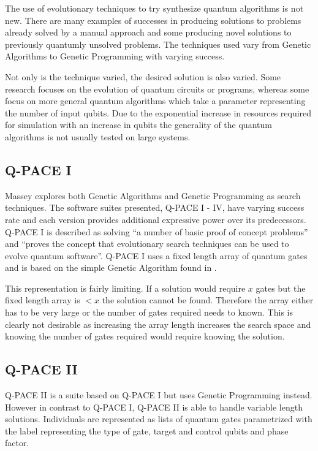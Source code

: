 The use of evolutionary techniques to try synthesize quantum algorithms is not new.
There are many examples of successes in producing solutions to problems already solved by a manual approach and some producing novel solutions to previously quantumly unsolved problems.
The techniques used vary from Genetic Algorithms to Genetic Programming with varying success.

Not only is the technique varied, the desired solution is also varied.
Some research focuses on the evolution of quantum circuits or programs, whereas some focus on more general quantum algorithms which take a parameter representing the number of input qubits.
Due to the exponential increase in resources required for simulation with an increase in qubits the generality of the quantum algorithms is not usually tested on large systems.

\subsection{Q-PACE I}
Massey\cite{masseythesis,masseymeng} explores both Genetic Algorithms and Genetic Programming as search techniques.
The software suites presented, Q-PACE I - IV, have varying success rate and each version provides additional expressive power over its predecessors.
Q-PACE I\cite{masseymeng} is described as solving ``a number of basic proof of concept problems''\cite{masseythesis} and ``proves the concept that evolutionary search techniques can be used to evolve quantum software''\cite{masseythesis}.
Q-PACE I uses a fixed length array of quantum gates and is based on the simple Genetic Algorithm found in \cite{1989goldberg}.

This representation is fairly limiting.
If a solution would require $x$ gates but the fixed length array is $<x$ the solution cannot be found.
Therefore the array either has to be very large or the number of gates required needs to known.
This is clearly not desirable as increasing the array length increases the search space and knowing the number of gates required would require knowing the solution.

\subsection{Q-PACE II}
Q-PACE II\cite{masseythesis} is a suite based on Q-PACE I but uses Genetic Programming instead.
However in contrast to Q-PACE I, Q-PACE II is able to handle variable length solutions. 
Individuals are represented as lists of quantum gates parametrized with the label representing the type of gate, target and control qubits and phase factor.

